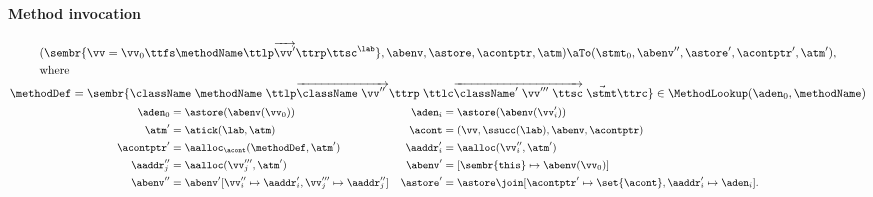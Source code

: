 \begin{figure}
\paragraph{Method invocation}
\begin{gather*}
\begin{split}
  &(
  \sembr{\vv = \vv_0 \ttfs \methodName \ttlp
    \overrightarrow{\vv'}
\ttrp \ttsc^\lab},
  \abenv,
  \astore,
  \acontptr,
  \atm
  )
  \aTo
  (
  \stmt_0,
  \abenv'',
  \astore',
  \acontptr',
  \atm'
  )\text{,}\\
  &\text{where }
\end{split}\\
  \methodDef = 
  \sembr{\className\; \methodName\; \ttlp 
   \overrightarrow{
   \className\; \vv''\;
  }
  \ttrp\;
  \ttlc
  \overrightarrow{\className'\; \vv'''\; \ttsc}\;
  \vec{\stmt}
  \ttrc}
  \in \MethodLookup(\aden_0,\methodName)
  \\
\begin{small}\begin{align*}
  \aden_0 &= \astore(\abenv(\vv_0))
  &
  \aden_i &= \astore(\abenv(\vv'_i))
  \\
  \atm' &= \atick(\lab,\atm)
  &
  \acont &= (\vv,\ssucc(\lab), \abenv, \acontptr)
  \\
  \acontptr' &= \aalloc_\acont(\methodDef,\atm')
  &
  \aaddr'_i &= \aalloc(\vv_i'',\atm')
  \\
  \aaddr''_j &= \aalloc(\vv_j''',\atm')
  &
  \abenv' &= [\sembr{\tt this} \mapsto \abenv(\vv_0)]
  \\
  \abenv'' &= \abenv'[\vv_i'' \mapsto \aaddr_i', \vv'''_j \mapsto \aaddr_j'']
  &
  \astore' &= \astore \join [\acontptr' \mapsto \set{\acont}, \aaddr'_i \mapsto \aden_i]
  \text.
\end{align*}\end{small}\end{gather*}






\end{figure}
